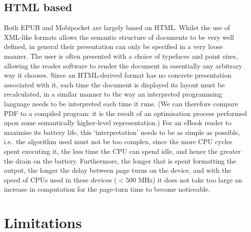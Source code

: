 \subsection{HTML based}
\label{html-format}
Both EPUB and Mobipocket are largely based on HTML. Whilst the use of XML-like formats allows the
semantic structure of documents to be very well defined, in general their presentation can only be
specified in a very loose manner. The user is often presented with a choice of typefaces and point
sizes, allowing the reader software to render the document in essentially any arbitrary way it
chooses. Since an HTML-derived format has no concrete presentation associated with it, each time the
document is displayed its layout must be recalculated, in a similar manner to the way an interpreted
programming language needs to be interpreted each time it runs. (We can therefore compare PDF to a
compiled program: it is the result of an optimisation process performed upon some semantically
higher-level representation.) For an eBook reader to maximise its battery life, this
`interpretation' needs to be as simple as possible, i.e.\ the algorithm used must not be too
complex, since the more CPU cycles spent executing it, the 
less time the CPU can spend idle, and hence the greater the drain on the battery. Furthermore, the
longer that is spent formatting the output, the longer the delay between page turns on the device,
and with the speed of CPUs used in these devices ($<500$ MHz) it does not take too large an increase
in computation for the page-turn time to become noticeable.



\section{Limitations}



